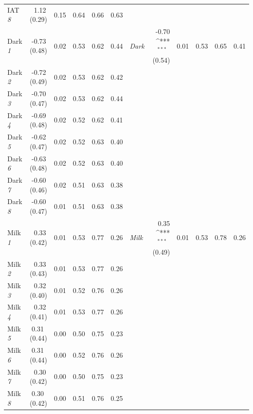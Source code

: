 \documentclass[12pt]{book}
\def\sym#1{\ifmmode^{#1}\else\(^{#1}\)\fi}
\begin{document}
\begin{landscape}
\begin{table}
\begin{tabular}{p{1.2cm} D{,}{.}{1} D{,}{.}{1} D{,}{.}{1}  D{,}{.}{1}  D{,}{.}{1}  p{1cm}  D{,}{.}{1}  D{,}{.}{1}  D{,}{.}{1}  D{,}{.}{1}  D{,}{.}{1} }
				IAT \emph{8}  	 & 	  1.12\, (0.29)  	  & 	0.15	  & 	0.64	  & 	0.66	  & 	0.63	 & 		 & 		  & 		  & 		  & 		  & 		  \\
				Dark \emph{1}  	 & 	  -0.73\, (0.48)   	  & 	0.02	  & 	0.53	  & 	0.62	  & 	0.44	 & 	\emph{Dark}   	 & 	  -0.70 \sym{***} \, (0.54)   	  & 	0.01	  & 	0.53	  & 	0.65	  & 	0.41	  \\
				Dark \emph{2}  	 & 	  -0.72\, (0.49)   	  & 	0.02	  & 	0.53	  & 	0.62	  & 	0.42	 & 		 & 		  & 		  & 		  & 		  & 		  \\
				Dark \emph{3}  	 & 	  -0.70\, (0.47)   	  & 	0.02	  & 	0.53	  & 	0.62	  & 	0.44	 & 		 & 		  & 		  & 		  & 		  & 		  \\
				Dark \emph{4}  	 & 	  -0.69\, (0.48)   	  & 	0.02	  & 	0.52	  & 	0.62	  & 	0.41	 & 		 & 		  & 		  & 		  & 		  & 		  \\
				Dark \emph{5}  	 & 	  -0.62\, (0.47)   	  & 	0.02	  & 	0.52	  & 	0.63	  & 	0.40	 & 		 & 		  & 		  & 		  & 		  & 		  \\
				Dark \emph{6}  	 & 	  -0.63\, (0.48)  	  & 	0.02	  & 	0.52	  & 	0.63	  & 	0.40	 & 		 & 		  & 		  & 		  & 		  & 		  \\
				Dark \emph{7}  	 & 	  -0.60\, (0.46)   	  & 	0.02	  & 	0.51	  & 	0.63	  & 	0.38	 & 		 & 		  & 		  & 		  & 		  & 		  \\
				Dark \emph{8}  	 & 	  -0.60\, (0.47)   	  & 	0.01	  & 	0.51	  & 	0.63	  & 	0.38	 & 		 & 		  & 		  & 		  & 		  & 		  \\
				Milk \emph{1}  	 & 	  0.33\, (0.42)   	  & 	0.01	  & 	0.53	  & 	0.77	  & 	0.26	 & 	\emph{Milk}   	 & 	  0.35 \sym{***} \, (0.49)  	  & 	0.01	  & 	0.53	  & 	0.78	  & 	0.26	  \\
				Milk \emph{2}  	 & 	  0.33\, (0.43)  	  & 	0.01	  & 	0.53	  & 	0.77	  & 	0.26	 & 		 & 		  & 		  & 		  & 		  & 		  \\
				Milk \emph{3}  	 & 	  0.32\, (0.40)  	  & 	0.01	  & 	0.52	  & 	0.76	  & 	0.26	 & 		 & 		  & 		  & 		  & 		  & 		  \\
				Milk \emph{4}  	 & 	  0.32\, (0.41)   	  & 	0.01	  & 	0.53	  & 	0.77	  & 	0.26	 & 		 & 		  & 		  & 		  & 		  & 		  \\
				Milk \emph{5}  	 & 	  0.31 \,(0.44)   	  & 	0.00	  & 	0.50	  & 	0.75	  & 	0.23	 & 		 & 		  & 		  & 		  & 		  & 		  \\
				Milk \emph{6}  	 & 	  0.31 \, (0.44)  	  & 	0.00	  & 	0.52	  & 	0.76	  & 	0.26	 & 		 & 		  & 		  & 		  & 		  & 		  \\
				Milk \emph{7}  	 & 	  0.30\, (0.42)  	  & 	0.00	  & 	0.50  & 	0.75	  & 	0.23	 & 		 & 		  & 		  & 		  & 		  & 		  \\
				Milk \emph{8}  	 & 	  0.30 \, (0.42)  	  & 	0.00	  & 	0.51	  & 	0.76	  & 	0.25	 & 		 & 		  & 		  & 		  & 		  & 		  \\
				

\end{tabular}
\end{table}
\end{landscape}
\end{document}

